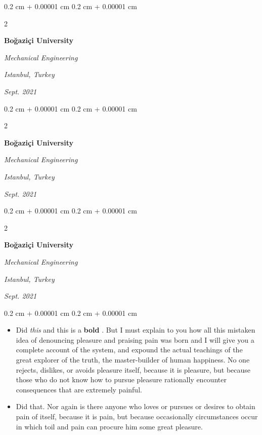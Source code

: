 \documentclass[10pt, letterpaper]{article}
\newenvironment{highlights}{
    \begin{itemize}[
        topsep=0.10 cm,
        parsep=0.10 cm,
        partopsep=0pt,
        itemsep=0pt,
        leftmargin=0.4 cm + 10pt
    ]
}{
    \end{itemize}
} %
\newenvironment{onecolentry}{
    \begin{adjustwidth}{
        0.2 cm + 0.00001 cm
    }{
        0.2 cm + 0.00001 cm
    }
}{
    \end{adjustwidth}
} %
\newenvironment{twocolentry}[2][]{
    \onecolentry
    \def\secondColumn{#2}
    \setcolumnwidth{\fill, 4.5 cm}
    \begin{paracol}{2}
}{
    \switchcolumn \raggedleft \secondColumn
    \end{paracol}
    \endonecolentry
} %
\let\hrefWithoutArrow\href
\renewcommand{\href}[2]{\hrefWithoutArrow{#1}{\mbox{\ifthenelse{\equal{#2}{}}{ }{#2 }\raisebox{.15ex}{\footnotesize \faExternalLink*}}}}
\begin{document}
        \vspace{0.2 cm-3px}

        \begin{twocolentry}{
        \textit{Istanbul, Turkey}    
            
        \textit{Sept. 2021}}
            \textbf{Boğaziçi University}

            \textit{Mechanical Engineering}
        \end{twocolentry}



        \vspace{0.2 cm-3px}

        \begin{twocolentry}{
        \textit{Istanbul, Turkey}    
            
        \textit{Sept. 2021}}
            \textbf{Boğaziçi University}

            \textit{Mechanical Engineering}
        \end{twocolentry}



        \vspace{0.2 cm-3px}

        \begin{twocolentry}{
        \textit{Istanbul, Turkey}    
            
        \textit{Sept. 2021}}
            \textbf{Boğaziçi University}

            \textit{Mechanical Engineering}
        \end{twocolentry}

        \vspace{0.10 cm-3px}
        \begin{onecolentry}
            \begin{highlights}
                \item Did \textit{this} and this is a \textbf{bold} \href{https://example.com}{link}. But I must explain to you how all this mistaken idea of denouncing pleasure and praising pain was born and I will give you a complete account of the system, and expound the actual teachings of the great explorer of the truth, the master-builder of human happiness. No one rejects, dislikes, or avoids pleasure itself, because it is pleasure, but because those who do not know how to pursue pleasure rationally encounter consequences that are extremely painful.
                \item Did that. Nor again is there anyone who loves or pursues or desires to obtain pain of itself, because it is pain, but because occasionally circumstances occur in which toil and pain can procure him some great pleasure.
            \end{highlights}
        \end{onecolentry}
\end{document}
